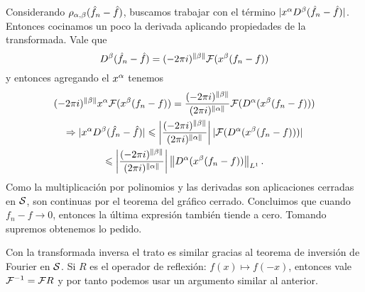 \documentclass[12pt]{memoir}
\begin{document}
\begin{ptcbp}
  Considerando $\rho_{\alpha,\beta}(\hat{f}_n-\hat{f})$, buscamos trabajar con el término $|x^\alpha D^\beta(\hat{f}_n-\hat{f})|$. Entonces cocinamos un poco la derivada aplicando propiedades de la transformada. Vale que 
  $$
    D^\beta(\hat{f}_n-\hat{f})=(-2\pi i)^{\left\|\beta\right\|}\mathcal{F}(x^\beta(f_n-f))
  $$
  y entonces agregando el $x^\alpha$ tenemos 
  \begin{gather*}
    (-2\pi i)^{\left\|\beta\right\|}x^\alpha\mathcal{F}(x^\beta(f_n-f))=\frac{(-2\pi i)^{\left\|\beta\right\|}}{(2\pi i)^{\left\|\alpha\right\|}}\mathcal{F}(D^\alpha (x^\beta(f_n-f)))\\
    \Rightarrow|x^\alpha D^\beta(\hat{f}_n-\hat{f})|\leqslant \left|\frac{(-2\pi i)^{\left\|\beta\right\|}}{(2\pi i)^{\left\|\alpha\right\|}}\right||\mathcal{F}(D^\alpha (x^\beta(f_n-f)))|\\
    \leqslant \left|\frac{(-2\pi i)^{\left\|\beta\right\|}}{(2\pi i)^{\left\|\alpha\right\|}}\right|\left\|D^\alpha (x^\beta(f_n-f))\right\|_{L^1}.
  \end{gather*}
  Como la multiplicación por polinomios y las derivadas son aplicaciones cerradas en $\mathcal{S}$, son continuas por el teorema del gráfico cerrado. Concluimos que cuando $f_n-f\to 0$, entonces la última expresión también tiende a cero. Tomando supremos obtenemos lo pedido.\par 
  Con la transformada inversa el trato es similar gracias al teorema de inversión de Fourier en $\mathcal{S}$. Si $R$ es el operador de reflexión: $f(x)\mapsto f(-x)$, entonces vale $\mathcal{F}^{-1}=\mathcal{F} R$ y por tanto podemos usar un argumento similar al anterior.
\end{ptcbp}
\ifx\nextra\undefined
\printindex
\else\fi
\nocite{*}


\end{document}
